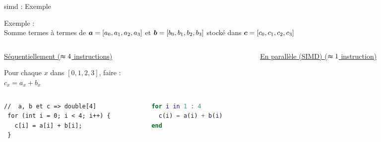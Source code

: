 \documentclass[../main.tex]{subfiles}
\begin{document}
\begin{frame}[fragile]{\acrshort{simd} : Exemple}

  Exemple : \\
  \hspace{2 em} \centering Somme termes à termes de $\bm{a} = [a_0, a_1, a_2, a_3]$ et $\bm{b} = [b_0, b_1, b_2, b_3]$ stocké dans $\bm{c} =  [c_0, c_1, c_2, c_3]$ \vspace{3 em} \\

  \begin{columns}
    \begin{column}{.5\linewidth}
      \begin{overlayarea}{\linewidth}{.4\textheight}
        \underline{Séquentiellement ($\thickapprox 4$ instructions)} \vspace{1 em}

        Pour chaque $x$ dans $[0,1,2,3]$, faire :\\
        \hspace{2 em} $c_x = a_x + b_x$

        \begin{columns}
          \begin{column}{.45\linewidth}
          \begin{lstlisting}[title={Sequentiellement en C},style=cstyle,basicstyle=\tiny]
 //  a, b et c => double[4]
 for (int i = 0; i < 4; i++) {
   c[i] = a[i] + b[i]; 
 }\end{lstlisting}
          \end{column}
          \begin{column}{.5\linewidth}
           \begin{lstlisting}[title={Sequentiellement en MATLAB},style=cstyle,language=MATLAB,basicstyle=\tiny]
 % a, b, et c => size = (1, 4)
 for i in 1 : 4
   c(i) = a(i) + b(i)
 end\end{lstlisting}
          \end{column}
        \end{columns}
      \end{overlayarea}
    \end{column}
    \begin{column}{.45\linewidth}
      \begin{overlayarea}{\linewidth}{.4\textheight}
        \underline{En parallèle (SIMD) ($\thickapprox 1$ instruction)} \vspace{1 em}


\end{overlayarea}
\end{column}
\end{columns}
\end{frame}
\end{document}
